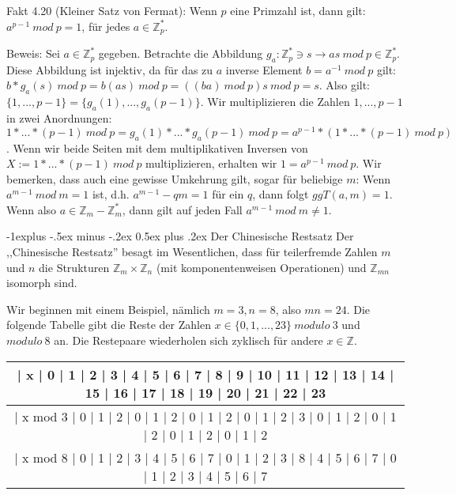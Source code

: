 \documentclass[a4paper]{article}
\makeatletter
\renewcommand{\subsection}{\@startsection{subsection}{2}{0mm}%
 {-1explus -.5ex minus -.2ex}%
 {0.5ex plus .2ex}%
 {\normalfont\normalsize\bfseries}}
\makeatother
\begin{document}
\begin{multicols}{3}
    Fakt 4.20 (Kleiner Satz von Fermat): Wenn $p$ eine Primzahl ist, dann gilt: $a^{p-1}\ mod\ p= 1$, für jedes $a\in\mathbb{Z}^*_p$.

    Beweis: Sei $a\in\mathbb{Z}^*_p$ gegeben. Betrachte die Abbildung $g_a: \mathbb{Z}^*_p \owns s\rightarrow as\ mod\ p\in\mathbb{Z}^*_p$. Diese Abbildung ist injektiv, da für das zu $a$ inverse Element $b=a^{-1}\ mod\ p$ gilt: $b*g_a(s)\ mod\ p=b(as)\ mod\ p=((ba)\ mod\ p)s\ mod\ p=s$. Also gilt: $\{1,...,p-1\}=\{g_a(1),...,g_a(p-1)\}$.
    Wir multiplizieren die Zahlen $1,...,p-1$ in zwei Anordnungen: $1*...*(p-1)\ mod\ p =g_a(1) *...*g_a(p-1)\ mod\ p=a^{p-1} *(1*...*(p-1)\ mod\ p)$.
    Wenn wir beide Seiten mit dem multiplikativen Inversen von $X:= 1*...*(p-1)\ mod\ p$ multiplizieren, erhalten wir $1=a^{p-1}\ mod\ p$.
    Wir bemerken, dass auch eine gewisse Umkehrung gilt, sogar für beliebige $m$: Wenn $a^{m-1}\ mod\ m=1$ ist, d.h. $a^{m-1}-qm=1$ für ein $q$, dann folgt $ggT(a,m)=1$. Wenn also $a\in\mathbb{Z}_m -\mathbb{Z}^*_m$, dann gilt auf jeden Fall $a^{m-1}\ mod\ m\not= 1$.

    \subsection{Der Chinesische Restsatz}
    Der ,,Chinesische Restsatz'' besagt im Wesentlichen, dass für teilerfremde Zahlen $m$ und $n$ die Strukturen $\mathbb{Z}_m \times\mathbb{Z}_n$ (mit komponentenweisen Operationen) und $\mathbb{Z}_{mn}$ isomorph sind.

    Wir beginnen mit einem Beispiel, nämlich $m=3,n=8$, also $mn=24$. Die folgende Tabelle gibt die Reste der Zahlen $x\in\{0,1,...,23\}\ modulo\ 3$ und $modulo\ 8$ an. Die Restepaare wiederholen sich zyklisch für andere $x\in\mathbb{Z}$.

    \begin{tabular}{c}
        | x  | 0  | 1  | 2  | 3  | 4  | 5  | 6  | 7  | 8  | 9  | 10 | 11 | 12 | 13 | 14 | 15 | 16 | 17 | 18 | 19 | 20 | 21 | 22 | 23          \\\hline
        | x mod 3 | 0  | 1  | 2  | 0  | 1  | 2  | 0  | 1  | 2  | 0  | 1  | 2  | 3  | 0  | 1  | 2  | 0  | 1  | 2  | 0  | 1  | 2  | 0  | 1  | 2 \\
        | x mod 8 | 0  | 1  | 2  | 3  | 4  | 5  | 6  | 7  | 0  | 1  | 2  | 3  | 8  | 4  | 5  | 6  | 7  | 0  | 1  | 2  | 3  | 4  | 5  | 6  | 7
    \end{tabular}


\end{multicols}
\end{document}
